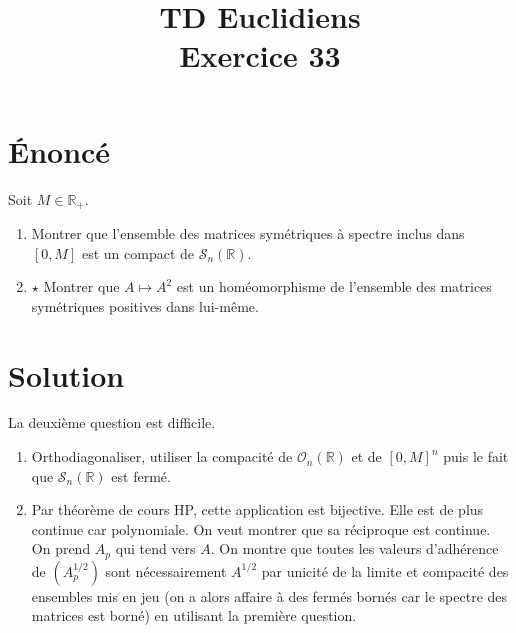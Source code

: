 \documentclass[french]{article}
\title{TD Euclidiens\\ Exercice 33}
\date{}
\newcommand{\R}{\mathbb{R}}
\begin{document}
\maketitle

\section{Énoncé}
Soit $M\in\R_+$.
\begin{enumerate}
	\item Montrer que l'ensemble des matrices symétriques à spectre inclus dans $[0,M]$ est un compact de $\mathcal{S}_n(\R)$.
	\item $\star$ Montrer que $A\mapsto A^2$ est un homéomorphisme de l'ensemble des matrices symétriques positives dans lui-même.
\end{enumerate}
\section{Solution}
La deuxième question est difficile.
\begin{enumerate}
	\item Orthodiagonaliser, utiliser la compacité de $\mathcal{O}_n(\R)$ et de $[0,M]^n$ puis le fait que $\mathcal{S}_n(\R)$ est fermé.
	\item Par théorème de cours HP, cette application est bijective. Elle est de plus continue car polynomiale. On veut montrer que sa réciproque est continue. On prend $A_p$ qui tend vers $A$. On montre que toutes les valeurs d'adhérence de $(A_p^{1/2})$ sont nécessairement $A^{1/2}$ par unicité de la limite et compacité des ensembles mis en jeu (on a alors affaire à des fermés bornés car le spectre des matrices est borné) en utilisant la première question.
\end{enumerate}
\end{document}
